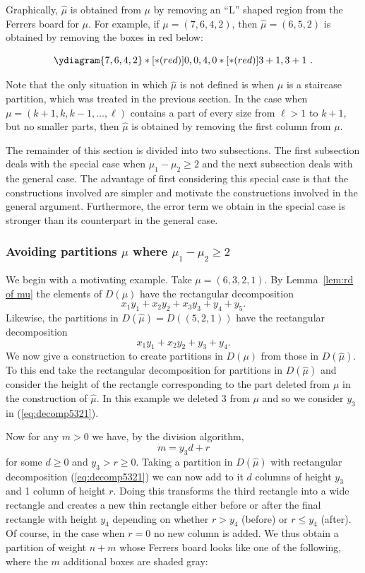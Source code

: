 \documentclass{article}
\theoremstyle{plain}
\theoremstyle{definition}
\begin{document}
Graphically, $\hat \mu$ is obtained from $\mu$ by removing an ``L'' shaped region from the Ferrers board for $\mu$.  For example, if $\mu=(7,6,4,2)$, then $\hat\mu = (6,5,2)$ is obtained by removing the boxes in red below:

$$\ydiagram{7,6,4,2}*[*(red)]{0,0,4,0}*[*(red)]{3+1,3+1}\ .$$

Note that the only situation in which $\hat \mu$ is not defined is when $\mu$ is a staircase partition, which was treated in the previous section.   In the case when $\mu=(k+1,k,k-1,\ldots, \ell)$ contains a part of every size from $\ell>1$ to $k+1$, but no smaller parts, then $\hat \mu$ is obtained by removing the first column from $\mu$. 

The remainder of this section is divided into two subsections.  The first subsection deals with the special case when $\mu_1-\mu_2\geq 2$ and the next subsection deals with the general case.  The advantage of first considering this special case is that the constructions involved are simpler and motivate the constructions involved in the general argument.  Furthermore, the error term we obtain in the special case is stronger than its counterpart in the general case.  

\subsubsection{Avoiding partitions $\mu$ where $\mu_1-\mu_2\geq 2$}\label{sssec:nonstaircase 1}
We begin with a motivating example. Take $\mu = (6,3,2,1)$.  By Lemma~\ref{lem:rd of mu} the elements of $D(\mu)$ have the rectangular decomposition
\begin{equation}\label{eq:decomp6321}
	x_1y_1 +x_2y_2 + x_3y_3 + y_4 + y_5.
\end{equation}
Likewise, the partitions in $D(\hat\mu) = D((5,2,1))$  have the rectangular decomposition
 \begin{equation}\label{eq:decomp5321}
x_1y_1 +x_2y_2 + y_3 + y_4.
\end{equation}
We now give a construction to create partitions in  $D(\mu)$ from those in $D(\hat\mu)$. To this end take the rectangular decomposition for partitions in $D(\hat\mu)$ and consider the height of the rectangle corresponding to the part deleted from $\mu$ in the construction of $\hat\mu$.  In this example we deleted 3 from $\mu$ and so we consider $y_3$ in (\ref{eq:decomp5321}).   

Now for any $m>0$ we have, by the division algorithm, 
$$m = y_3d + r$$
for some $d\geq 0$ and  $y_3>r \geq 0$.  Taking a partition in $D(\hat\mu)$ with rectangular decomposition (\ref{eq:decomp5321}) we can now add to it $d$ columns of height $y_3$ and 1 column of height $r$.  Doing this transforms the third rectangle into a wide rectangle and creates a new thin rectangle either before or after the final rectangle with height $y_4$ depending on whether $r>y_4$ (before) or $r\leq y_4$ (after).  Of course, in the case when $r=0$ no new column is added. We thus obtain a partition of weight $n+m$ whose Ferrers board looks like one of the following, where the $m$ additional boxes are shaded gray:
\end{document}
